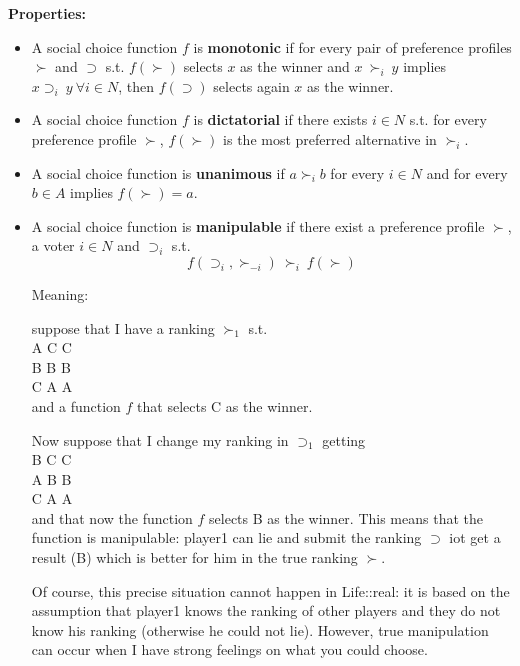 \bigskip
\noindent \textbf{Properties:}
\begin{itemize}
	\item A social choice function $f$ is \textbf{monotonic} if for every pair of preference profiles $\succ$ and $\supset$ s.t. $f(\succ)$ selects $x$ as the winner and $x ~\succ_i ~y$ implies $x \supset_i ~y ~\forall i \in N$, then $f(\supset)$ selects again $x$ as the winner.
	
	\item A social choice function $f$ is \textbf{dictatorial} if there exists $i \in N$ s.t. for every preference profile $\succ$, $f(\succ)$ is the most preferred alternative in $\succ_i$.
	
	\item A social choice function is \textbf{unanimous} if $a \succ_i b$ for every $i \in N$ and for every $b \in A$ implies $f(\succ) = a$.
	
	\item  A social choice function is \textbf{manipulable} if there exist a preference profile $\succ$, a voter $i \in N$ and $\supset_i$ s.t.
	\[
		f(\supset_i, \succ_{-i}) ~\succ_i~ f(\succ)
	\]
	
	\noindent Meaning:
	
	\noindent suppose that I have a ranking $\succ_1$ s.t.\\
	A \hspace{.6cm} C \hspace{.6cm} C\\
	B \hspace{.6cm} B \hspace{.6cm} B\\
	C \hspace{.6cm} A \hspace{.6cm} A\\
	and a function $f$ that selects C as the winner.
	
	\noindent Now suppose that I change my ranking in $\supset_1$ getting\\ 
	B \hspace{.6cm} C \hspace{.6cm} C\\
	A \hspace{.6cm} B \hspace{.6cm} B\\
	C \hspace{.6cm} A \hspace{.6cm} A\\
	and that now the function $f$ selects B as the winner. This means that the 
	function is manipulable: player1 can lie and submit the ranking $\supset$ iot 
	get a result (B) which is better for him in the true ranking $\succ$.
	
	\noindent Of course, this precise situation cannot happen in Life::real: it is 
	based on the assumption that player1 knows the ranking of other players and 
	they do not know his ranking (otherwise he could not lie). However, true 
	manipulation can occur when I have strong feelings on what you could choose.
\end{itemize}

